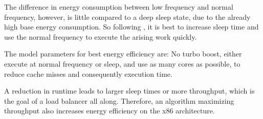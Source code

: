 The difference in energy consumption between low frequency and normal
frequency, however, is little compared to a deep sleep state, due to the
already high base energy consumption.
So following \cite{imes_poet_2015}, it is best to increase sleep time and use
the normal frequency to execute the arising work quickly.

The model parameters for best energy efficiency are:
No turbo boost, either execute at normal frequency or sleep, and use as many
cores as possible, to reduce cache misses and consequently execution time.

A reduction in runtime leads to larger sleep times or more throughput, which is
the goal of a load balancer all along.
Therefore, an algorithm maximizing throughput also increases energy efficiency
on the x86 architecture.


